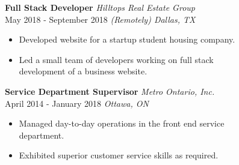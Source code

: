 \documentclass[]{article}
\theoremstyle{plain}
\theoremstyle{remark}
\theoremstyle{definition}
\begin{document}
\begin{figure}
\begin{minipage}[t]{0.65\textwidth}
\color{black}
\textbf{Full Stack Developer} \hfill \emph{Hilltops Real Estate Group}\\
May 2018 - September 2018 \hfill\emph {(Remotely) Dallas, TX}
\color{gray}
\begin{itemize}[itemsep=0em]
\item Developed website for a startup student housing company.
\item Led a small team of developers working on full stack development of a business website.
\end{itemize}

\color{black}
\textbf{Service Department Supervisor} \hfill \emph{Metro Ontario, Inc.}\\
April 2014 - January 2018 \hfill\emph {Ottawa, ON}
\color{gray}
\begin{itemize}[itemsep=0em]
\item Managed day-to-day operations in the front end service department.
\item Exhibited superior customer service skills as required.
\end{itemize}


%


\end{minipage}
\end{figure}
\end{document}
